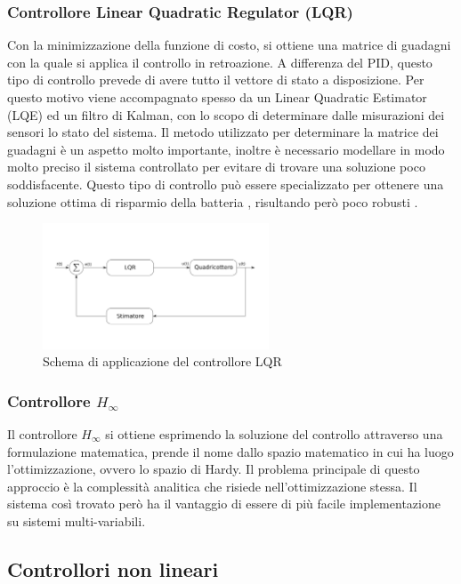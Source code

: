 \subsubsection{Controllore Linear Quadratic Regulator (LQR)}
Con la minimizzazione della funzione di costo, si ottiene una matrice di guadagni con la quale si applica il controllo in retroazione. A differenza del PID, questo tipo di controllo prevede di avere tutto il vettore di stato a disposizione. Per questo motivo viene accompagnato spesso da un Linear Quadratic Estimator (LQE) ed un filtro di Kalman, con lo scopo di determinare dalle misurazioni dei sensori lo stato del sistema. Il metodo utilizzato per determinare la matrice dei guadagni è un aspetto molto importante, inoltre è necessario modellare in modo molto preciso il sistema controllato per evitare di trovare una soluzione poco soddisfacente. Questo tipo di controllo può essere specializzato per ottenere una soluzione ottima di risparmio della batteria \cite{KoksalN2018ALQA}, risultando però poco robusti \cite{ZuluAndrew2014ARoC}.

\begin{figure}
	\centering
	\includegraphics[width=0.6\textwidth]{SistemaQuadrirotore/Figure/LQR}
	\caption{Schema di applicazione del controllore LQR}
\end{figure}
 

\subsubsection{Controllore $H_\infty$}

Il controllore $H_\infty$ si ottiene esprimendo la soluzione del controllo attraverso una formulazione matematica, prende il nome dallo spazio matematico in cui ha luogo l'ottimizzazione, ovvero lo spazio di Hardy. Il problema principale di questo approccio è la complessità analitica che risiede nell'ottimizzazione stessa. Il sistema così trovato però ha il vantaggio di essere di più facile implementazione su sistemi multi-variabili. 

\subsection{Controllori non lineari}

